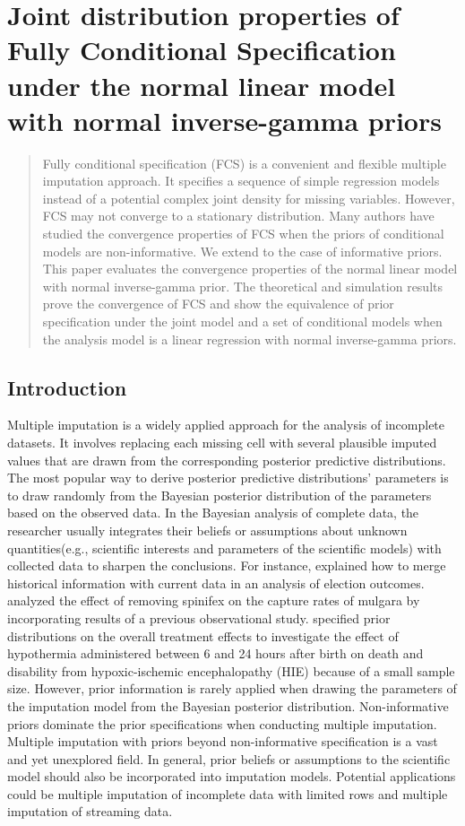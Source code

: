 \chapter{Joint distribution properties of Fully Conditional Specification under the normal linear model with normal inverse-gamma priors}
\label{chap5}
	\begin{abstract}
		Fully conditional specification (FCS) is a convenient and flexible multiple imputation approach. It specifies a sequence of simple regression models instead of a potential complex joint density for missing variables. However, FCS may not converge to a stationary distribution. Many authors have studied the convergence properties of FCS when the priors of conditional models are non-informative. We extend to the case of informative priors. This paper evaluates the convergence properties of the normal linear model with normal inverse-gamma prior. The theoretical and simulation results prove the convergence of FCS and show the equivalence of prior specification under the joint model and a set of conditional models when the analysis model is a linear regression with normal inverse-gamma priors.  
	\end{abstract}
	
	\section{Introduction}
Multiple imputation \citep{RubinD1987} is a widely applied approach for the analysis of incomplete datasets. It involves replacing each missing cell with several plausible imputed values that are drawn from the corresponding posterior predictive distributions. The most popular way to derive posterior predictive distributions' parameters is to draw randomly from the Bayesian posterior distribution of the parameters based on the observed data. In the Bayesian analysis of complete data, the researcher usually integrates their beliefs or assumptions about unknown quantities(e.g., scientific interests and parameters of the scientific models) with collected data to sharpen the conclusions. For instance, \citet{jackman2004bayesian} explained how to merge historical information with current data in an analysis of election outcomes. \citet{mccarthy2005profiting} analyzed the effect of removing spinifex on the capture rates of mulgara by incorporating results of a previous observational study. \citet{laptook2017effect} specified prior distributions on the overall treatment effects to investigate the effect of hypothermia administered between 6 and 24 hours after birth on death and disability from hypoxic-ischemic encephalopathy (HIE) because of a small sample size. However, prior information is rarely applied when drawing the parameters of the imputation model from the Bayesian posterior distribution. Non-informative priors dominate the prior specifications when conducting multiple imputation. Multiple imputation with priors beyond non-informative specification is a vast and yet unexplored field. In general, prior beliefs or assumptions to the scientific model should also be incorporated into imputation models. Potential applications could be multiple imputation of incomplete data with limited rows and multiple imputation of streaming data.  

